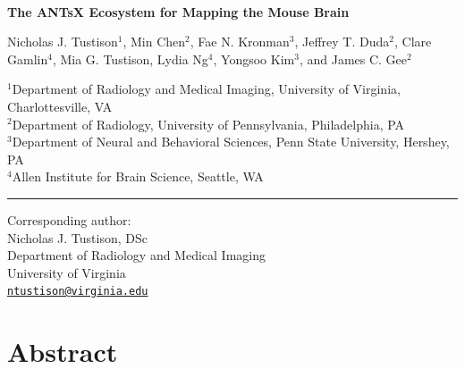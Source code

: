 \documentclass[
  12pt,
]{article}
\author{}
\date{\vspace{-2.5em}}
\begin{document}
\linenumbers
{}


\begin{centering}

$ $

\vspace{6cm}

\LARGE

{\bf The ANTsX Ecosystem for Mapping the Mouse Brain}

\vspace{1.0 cm}

\normalsize

Nicholas J. Tustison$^{1}$,
Min Chen$^{2}$,
Fae N. Kronman$^{3}$,
Jeffrey T. Duda$^{2}$,
Clare Gamlin$^{4}$,
Mia G. Tustison,
Lydia Ng$^{4}$,
Yongsoo Kim$^{3}$, and
James C. Gee$^{2}$

\small

$^{1}$Department of Radiology and Medical Imaging, University of Virginia, Charlottesville, VA \\
$^{2}$Department of Radiology, University of Pennsylvania, Philadelphia, PA \\
$^{3}$Department of Neural and Behavioral Sciences, Penn State University, Hershey, PA \\
$^{4}$Allen Institute for Brain Science, Seattle, WA \\

\vspace{1.2 cm}

\end{centering}

\vspace{5.5 cm}

\noindent

\rule{4cm}{0.4pt}

\scriptsize

Corresponding author:\\
Nicholas J. Tustison, DSc\\
Department of Radiology and Medical Imaging\\
University of Virginia\\
\href{mailto:ntustison@virginia.edu}{\nolinkurl{ntustison@virginia.edu}}

\normalsize

\newpage


\hypertarget{abstract}{%
\section*{Abstract}\label{abstract}}
\end{document}
